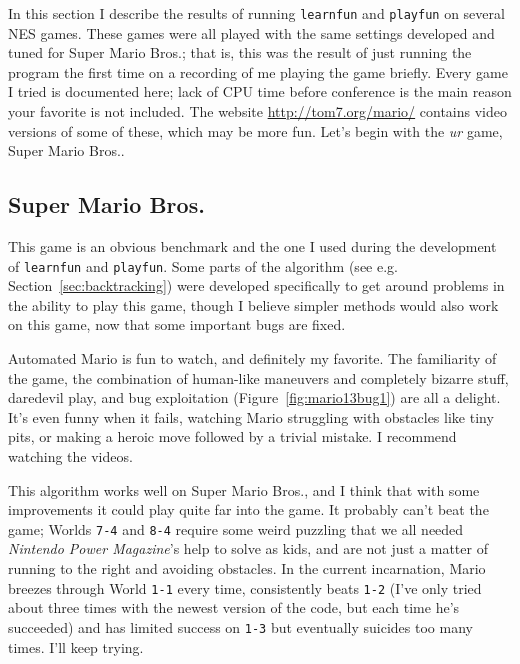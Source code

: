 \documentclass[twocolumn]{article}
\begin{document}
In this section I describe the results of running {\tt learnfun} and
{\tt playfun} on several NES games. These games were all played with
the same settings developed and tuned for Super Mario Bros.; that is,
this was the result of just running the program the first time on a
recording of me playing the game briefly. Every game I tried is
documented here; lack of CPU time before conference is the main reason
your favorite is not included. The website \url{http://tom7.org/mario/}
contains video versions of some of these, which may be more fun. Let's
begin with the {\em ur} game, Super Mario Bros..

\subsection{Super Mario Bros.}

This game is an obvious benchmark and the one I used during the
development of {\tt learnfun} and {\tt playfun}. Some parts of the
algorithm (see e.g. Section~\ref{sec:backtracking}) were developed
specifically to get around problems in the ability to play this game,
though I believe simpler methods would also work on this game, now
that some important bugs are fixed.

Automated Mario is fun to watch, and definitely my favorite. The
familiarity of the game, the combination of human-like maneuvers and
completely bizarre stuff, daredevil play, and bug exploitation
(Figure~\ref{fig:mario13bug1}) are all a delight. It's even funny when
it fails, watching Mario struggling with obstacles like tiny pits, or
making a heroic move followed by a trivial mistake. I recommend
watching the videos.

This algorithm works well on Super Mario Bros., and I think that with
some improvements it could play quite far into the game. It probably
can't beat the game; Worlds {\tt 7-4} and {\tt 8-4} require some weird
puzzling that we all needed {\em Nintendo Power Magazine}'s help to
solve as kids, and are not just a matter of running to the right and
avoiding obstacles. In the current incarnation, Mario breezes through
World {\tt 1-1} every time, consistently beats {\tt 1-2} (I've only
tried about three times with the newest version of the code, but each
time he's succeeded) and has limited success on {\tt 1-3} but
eventually suicides too many times. I'll keep trying.
\end{document}
